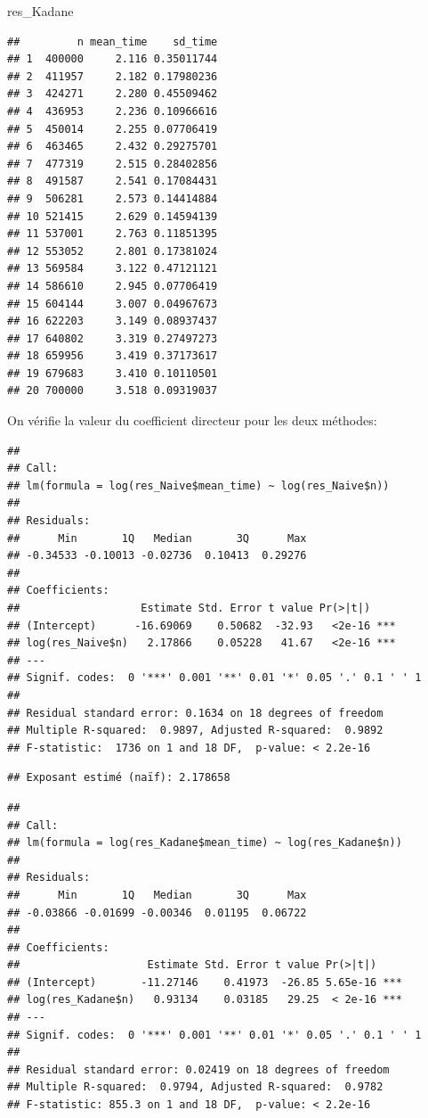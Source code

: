 \documentclass[
]{article}
\newenvironment{Shaded}{\begin{snugshade}}{\end{snugshade}}
\newcommand{\NormalTok}[1]{#1}
\begin{document}
\begin{Shaded}
\begin{Highlighting}[]
\NormalTok{res\_Kadane}
\end{Highlighting}
\end{Shaded}

\begin{verbatim}
##         n mean_time    sd_time
## 1  400000     2.116 0.35011744
## 2  411957     2.182 0.17980236
## 3  424271     2.280 0.45509462
## 4  436953     2.236 0.10966616
## 5  450014     2.255 0.07706419
## 6  463465     2.432 0.29275701
## 7  477319     2.515 0.28402856
## 8  491587     2.541 0.17084431
## 9  506281     2.573 0.14414884
## 10 521415     2.629 0.14594139
## 11 537001     2.763 0.11851395
## 12 553052     2.801 0.17381024
## 13 569584     3.122 0.47121121
## 14 586610     2.945 0.07706419
## 15 604144     3.007 0.04967673
## 16 622203     3.149 0.08937437
## 17 640802     3.319 0.27497273
## 18 659956     3.419 0.37173617
## 19 679683     3.410 0.10110501
## 20 700000     3.518 0.09319037
\end{verbatim}

On vérifie la valeur du coefficient directeur pour les deux méthodes:

\begin{verbatim}
## 
## Call:
## lm(formula = log(res_Naive$mean_time) ~ log(res_Naive$n))
## 
## Residuals:
##      Min       1Q   Median       3Q      Max 
## -0.34533 -0.10013 -0.02736  0.10413  0.29276 
## 
## Coefficients:
##                   Estimate Std. Error t value Pr(>|t|)    
## (Intercept)      -16.69069    0.50682  -32.93   <2e-16 ***
## log(res_Naive$n)   2.17866    0.05228   41.67   <2e-16 ***
## ---
## Signif. codes:  0 '***' 0.001 '**' 0.01 '*' 0.05 '.' 0.1 ' ' 1
## 
## Residual standard error: 0.1634 on 18 degrees of freedom
## Multiple R-squared:  0.9897, Adjusted R-squared:  0.9892 
## F-statistic:  1736 on 1 and 18 DF,  p-value: < 2.2e-16
\end{verbatim}

\begin{verbatim}
## Exposant estimé (naïf): 2.178658
\end{verbatim}

\begin{verbatim}
## 
## Call:
## lm(formula = log(res_Kadane$mean_time) ~ log(res_Kadane$n))
## 
## Residuals:
##      Min       1Q   Median       3Q      Max 
## -0.03866 -0.01699 -0.00346  0.01195  0.06722 
## 
## Coefficients:
##                    Estimate Std. Error t value Pr(>|t|)    
## (Intercept)       -11.27146    0.41973  -26.85 5.65e-16 ***
## log(res_Kadane$n)   0.93134    0.03185   29.25  < 2e-16 ***
## ---
## Signif. codes:  0 '***' 0.001 '**' 0.01 '*' 0.05 '.' 0.1 ' ' 1
## 
## Residual standard error: 0.02419 on 18 degrees of freedom
## Multiple R-squared:  0.9794, Adjusted R-squared:  0.9782 
## F-statistic: 855.3 on 1 and 18 DF,  p-value: < 2.2e-16
\end{verbatim}
\end{document}
